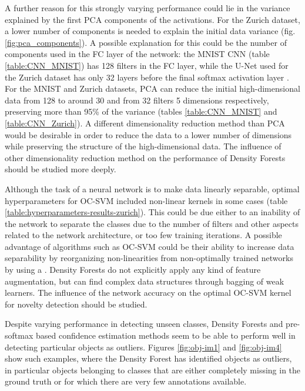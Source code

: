 \documentclass[10pt]{article}
\begin{document}
A further reason for this strongly varying performance could lie in the variance explained by the first \gls{PCA} components of the activations. For the Zurich dataset, a lower number of components is needed to explain the initial data variance (fig. \ref{fig:pca_components}). A possible explanation for this could be the number of components used in the \gls{FC} layer of the network: the MNIST \gls{CNN} (table \ref{table:CNN_MNIST}) has 128 filters in the \gls{FC} layer, while the U-Net used for the Zurich dataset has only 32 layers before the final softmax activation layer .  For the MNIST and Zurich datasets, PCA can reduce the initial high-dimensional data from 128 to around 30 and from 32 filters 5 dimensions respectively, preserving more than 95\% of the variance (tables \ref{table:CNN_MNIST} and \ref{table:CNN_Zurich}). A different dimensionality reduction method than \gls{PCA} would be desirable in order to reduce the data to a lower number of dimensions while preserving the structure of the high-dimensional data. The influence of other dimensionality reduction method on the performance of Density Forests should be studied more deeply.

Although the task of a neural network is to make data linearly separable, optimal hyperparameters for \gls{OC-SVM} included non-linear kernels in some cases (table \ref{table:hyperparameters-results-zurich}). This could be due either to an inability of the network to separate the classes due to the number of filters and other aspects related to the network architecture, or too few training iterations. A possible advantage of algorithms such as \gls{OC-SVM} could be their ability to increase data separability by reorganizing non-linearities from non-optimally trained networks by using a . Density Forests do not explicitly apply any kind of feature augmentation, but can find complex data structures through bagging of weak learners. The influence of the network accuracy on the optimal \gls{OC-SVM} kernel for novelty detection should be studied.

Despite varying performance in detecting unseen classes, Density Forests and pre-softmax based confidence estimation methods seem to be able to perform well in detecting particular objects as outliers. Figures \ref{fig:obj-im1} and \ref{fig:obj-im4} show such examples, where the Density Forest has identified objects as outliers, in particular objects belonging to classes that are either completely missing in the ground truth or for which there are very few annotations available.
\end{document}
